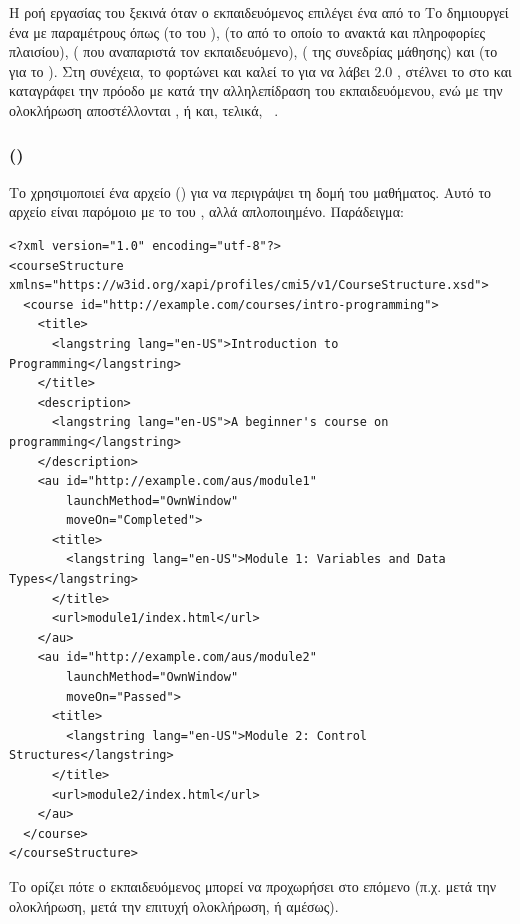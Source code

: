 Η ροή εργασίας του  ξεκινά όταν ο εκπαιδευόμενος επιλέγει ένα   από το  Το  δημιουργεί ένα \textit{ } με παραμέτρους όπως \texttt{} (το  του ), \texttt{} (το  από το οποίο το  ανακτά   και πληροφορίες πλαισίου), \texttt{} (  που αναπαριστά τον εκπαιδευόμενο), \texttt{} ( της συνεδρίας μάθησης) και \texttt{} (το    για το ). Στη συνέχεια, το  φορτώνει και καλεί το \texttt{}  για να λάβει  2.0 , στέλνει το \texttt{}  στο  και καταγράφει την πρόοδο με   κατά την αλληλεπίδραση του εκπαιδευόμενου, ενώ με την ολοκλήρωση αποστέλλονται \texttt{}, \texttt{} ή \texttt{} και, τελικά, \texttt{} ~\cite{rustici2021cmi5}.

\subsubsection{   ()}

Το  χρησιμοποιεί ένα  αρχείο (\texttt{}) για να περιγράψει τη δομή του μαθήματος. Αυτό το αρχείο είναι παρόμοιο με το \texttt{} του , αλλά απλοποιημένο. Παράδειγμα:
{\selectfont
\begin{verbatim}
<?xml version="1.0" encoding="utf-8"?>
<courseStructure xmlns="https://w3id.org/xapi/profiles/cmi5/v1/CourseStructure.xsd">
  <course id="http://example.com/courses/intro-programming">
    <title>
      <langstring lang="en-US">Introduction to Programming</langstring>
    </title>
    <description>
      <langstring lang="en-US">A beginner's course on programming</langstring>
    </description>
    <au id="http://example.com/aus/module1" 
        launchMethod="OwnWindow" 
        moveOn="Completed">
      <title>
        <langstring lang="en-US">Module 1: Variables and Data Types</langstring>
      </title>
      <url>module1/index.html</url>
    </au>
    <au id="http://example.com/aus/module2" 
        launchMethod="OwnWindow" 
        moveOn="Passed">
      <title>
        <langstring lang="en-US">Module 2: Control Structures</langstring>
      </title>
      <url>module2/index.html</url>
    </au>
  </course>
</courseStructure>
\end{verbatim}
}
Το \texttt{}  ορίζει πότε ο εκπαιδευόμενος μπορεί να προχωρήσει στο επόμενο  (π.χ. μετά την ολοκλήρωση, μετά την επιτυχή ολοκλήρωση, ή αμέσως).

